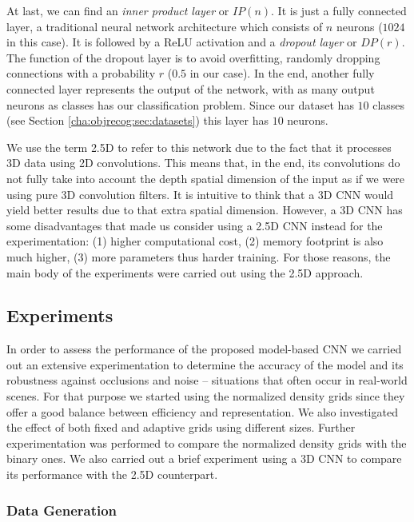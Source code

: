 At last, we can find an \emph{inner product layer} or $IP(n)$. It is just a fully connected layer, a traditional neural network architecture which consists of $n$ neurons ($1024$ in this case). It is followed by a \acs{ReLU} activation and a \emph{dropout layer} \cite{Srivastava2014} or $DP(r)$. The function of the dropout layer is to avoid overfitting, randomly dropping connections with a probability $r$ ($0.5$ in our case). In the end, another fully connected layer represents the output of the network, with as many output neurons as classes has our classification problem. Since our dataset has $10$ classes (see Section \ref{cha:objrecog:sec:datasets}) this layer has $10$ neurons.

We use the term \acs{2.5D} to refer to this network due to the fact that it processes \acs{3D} data using \acs{2D} convolutions. This means that, in the end, its convolutions do not fully take into account the depth spatial dimension of the input as if we were using pure \acs{3D} convolution filters. It is intuitive to think that a \acs{3D} \acs{CNN} would yield better results due to that extra spatial dimension. However, a \acs{3D} \acs{CNN} has some disadvantages that made us consider using a \acs{2.5D} \acs{CNN} instead for the experimentation: (1) higher computational cost, (2) memory footprint is also much higher, (3) more parameters thus harder training. For those reasons, the main body of the experiments were carried out using the \acs{2.5D} approach.

\subsection{Experiments}
\label{cha:objrecog:sec:study:subsec:experiments}

In order to assess the performance of the proposed model-based \acs{CNN} we carried out an extensive experimentation to determine the accuracy of the model and its robustness against occlusions and noise -- situations that often occur in real-world scenes. For that purpose we started using the normalized density grids since they offer a good balance between efficiency and representation. We also investigated the effect of both fixed and adaptive grids using different sizes. Further experimentation was performed to compare the normalized density grids with the binary ones. We also carried out a brief experiment using a \acs{3D} \acs{CNN} to compare its performance with the \acs{2.5D} counterpart.

\subsubsection{Data Generation}
\label{cha:objrecog:sec:study:subsec:experiments:subsubsec:data}

